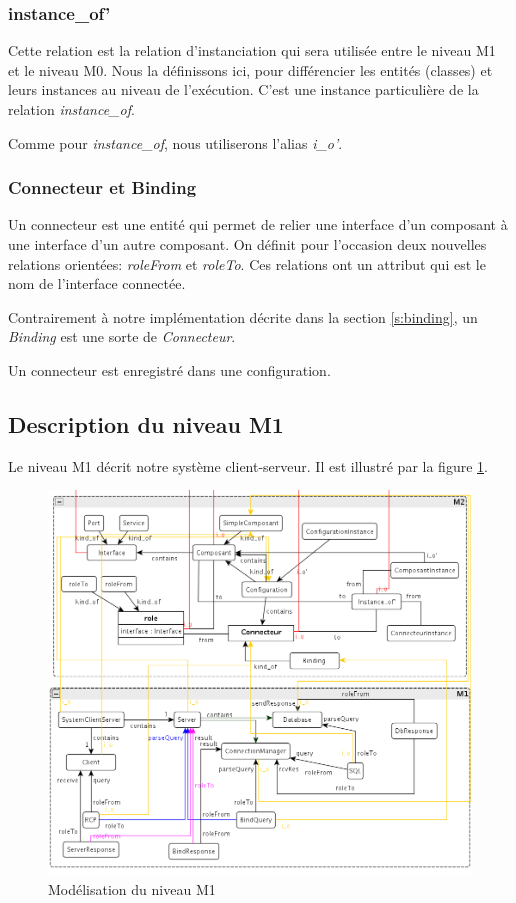 \documentclass[french,a4paper,titlepage]{article}
\begin{document}
		\subsubsection{instance\_of'}
		
			Cette relation est la relation d'instanciation qui sera utilisée entre le
			niveau M1 et le niveau M0. Nous la définissons ici, pour différencier les
			entités (classes) et leurs instances au niveau de l'exécution. C'est une
			instance particulière de la relation \emph{instance\_of}.
			
			Comme pour \emph{instance\_of}, nous utiliserons l'alias \emph{i\_o'}.
			
			
			
		\subsubsection{Connecteur et Binding}
			Un connecteur est une entité qui permet de relier une interface d'un
			composant à une interface d'un autre composant. On définit pour l'occasion
			deux nouvelles relations orientées: \emph{roleFrom} et \emph{roleTo}. Ces
			relations ont un attribut qui est le nom de l'interface connectée.
			
			Contrairement à notre implémentation décrite dans la section
			\ref{s:binding}, un \emph{Binding} est une sorte de \emph{Connecteur}.
			
			Un connecteur est enregistré dans une configuration.
			
			
			
	\subsection{Description du niveau M1}
	
		Le niveau M1 décrit notre système client-serveur. Il est illustré par la
		figure \ref{fig:m1-new}.
	
		\begin{figure}[htb]
			\centering
			\includegraphics[width=\textwidth]{m1-new.png}
			\caption{Modélisation du niveau M1}
			\label{fig:m1-new}
		\end{figure}
		
\end{document}
